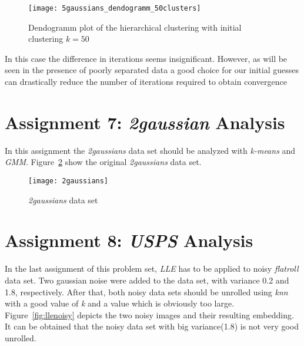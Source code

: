 \begin{figure}[h!]
	\centering
	\texttt{[image: 5gaussians\_dendogramm\_50clusters]}
	\caption{Dendogramm plot of the hierarchical clustering with initial clustering $k=50$}
	\label{fig:5gaussians_dendogramm_50clusters}
\end{figure}

In this case the difference in iterations
seems insignificant. However, as will be seen in the presence of poorly separated data a good choice for our
initial guesses can drastically reduce the number of iterations required to obtain convergence


\section{Assignment 7: \textit{2gaussian} Analysis}
\label{assignment7}

In this assignment the \textit{2gaussians} data set should be analyzed with \textit{k-means} and \textit{GMM}. Figure~\ref{fig:2gaussians} show the original \textit{2gaussians} data set.

\begin{figure}[h!]
	\centering
	\texttt{[image: 2gaussians]}
	\caption{\textit{2gaussians} data set}
	\label{fig:2gaussians}
\end{figure}



\section{Assignment 8: \textit{USPS} Analysis}
\label{assignment8}

In the last assignment of this problem set, \textit{LLE} has to be applied to noisy \textit{flatroll} data set. Two gaussian noise were added to the data set, with variance 0.2 and 1.8, respectively. After that, both noisy data sets should be unrolled using \textit{knn} with a good value of \textit{k} and a value which is obviously too large. Figure~\ref{fig:llenoisy} depicts the two noisy images and their resulting embedding. It can be obtained that the noisy data set with big variance(1.8) is not very good unrolled.


